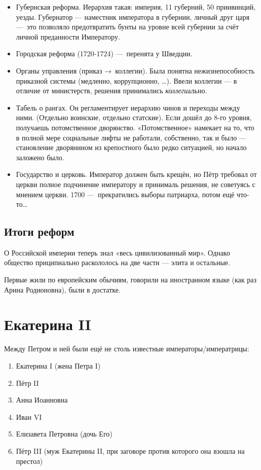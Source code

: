 \documentclass[12pt, a4paper]{article}
\begin{document}
\begin{itemize}
    \item Губернская реформа. Иерархия такая: империя, 11 губерний, 50 приивинций, уезды. 
    Губернатор — наместник императора в губернии, личный друг царя — это позволяло предотвратить бунты на уровне всей губернии за счёт личной преданности Императору. 

    \item Городская реформа (1720-1724) — перенята у Шведции.
    \item Органы управления (приказ → коллегии). Была понятна нежизнепособность приказной системы (медленно, коррупционно, …). 
    Ввели коллегии — в отличие от министерств, решения принимались \textit{коллеги}ально.

    \item Табель о рангах. Он регламентирует иерархию чинов и переходы между ними. (Отдельно воинские, отдельно статские). 
    Если дошёл до 8-го уровня, получаешь потомственное дворянство. 
    «Потомственное» намекает на то, что в полной мере социальные лифты не работали, собственно, 
    так и было — становление дворянином из крепостного было редко ситуацией, но начало заложено было.
    
    \item Государство и церковь. Император должен быть крещён, но Пётр требовал от церкви полное подчинение императору и принималь решения, не советуясь с мнением церкви.
    1700 — прекратились выборы патриарха, потом ещё что-то…
\end{itemize}

\subsection{Итоги реформ}

О Российской империи теперь знал «весь цивилизованный мир». 
Однако общество приципиально раскололось на две части — элита и остальные.

Первые жили по европейским обычиям, говорили на иностранном языке (как раз Арина Родионовна), были в достатке. 



\section{Екатерина II}

Между Петром и ней были ещё не столь известные императоры/императрицы: 
\begin{enumerate}
    \item Екатерина I (жена Петра I)
    \item Пётр II
    \item Анна Иоанновна
    \item Иван VI
    \item Елизавета Петровна (дочь Его)
    \item Пётр III (муж Екатерины II, при заговоре против которого она взошла на престол)
\end{enumerate} 
\end{document}

